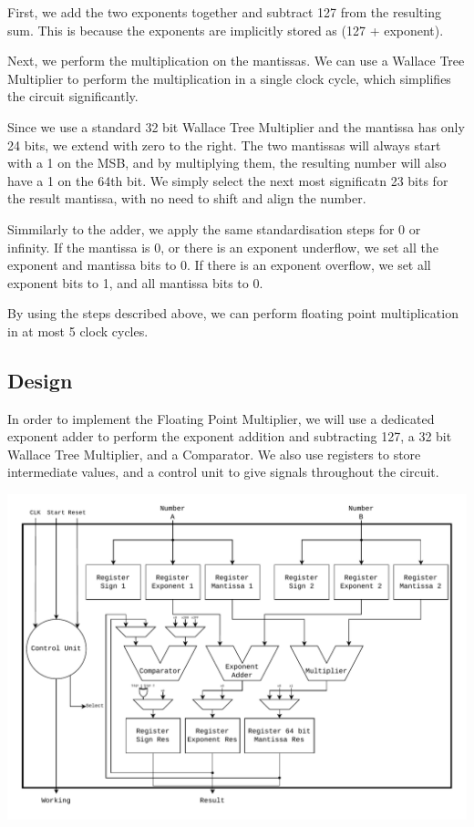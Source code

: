 \documentclass[a4paper,10pt]{article}
\begin{document}
    First, we add the two exponents together and subtract 127 from the resulting sum. This is because the exponents are implicitly stored as (127 + exponent).

    Next, we perform the multiplication on the mantissas. We can use a Wallace Tree Multiplier to perform the multiplication in a single clock cycle, which simplifies the circuit significantly.

    Since we use a standard 32 bit Wallace Tree Multiplier and the mantissa has only 24 bits, we extend with zero to the right. The two mantissas will always start with a 1 on the MSB, and by multiplying them, the resulting number will also have a 1 on the 64th bit. We simply select the next most significatn 23 bits for the result mantissa, with no need to shift and align the number.

    Simmilarly to the adder, we apply the same standardisation steps for 0 or infinity. If the mantissa is 0, or there is an exponent underflow, we set all the exponent and mantissa bits to 0. If there is an exponent overflow, we set all exponent bits to 1, and all mantissa bits to 0.

    By using the steps described above, we can perform floating point multiplication in at most 5 clock cycles.

    \newpage
    \subsection{Design}
    In order to implement the Floating Point Multiplier, we will use a dedicated exponent adder to perform the exponent addition and subtracting 127, a 32 bit Wallace Tree Multiplier, and a Comparator. We also use registers to store intermediate values, and a control unit to give signals throughout the circuit.
    \centerline{\includegraphics[scale=0.75, trim= 0cm 12cm 0cm 0cm]{fpMultiplier.pdf}}
\end{document}
